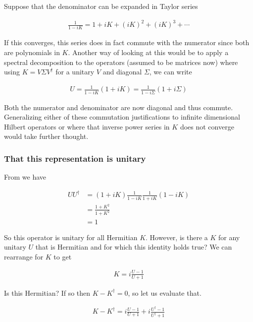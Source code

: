 Suppose that the denominator can be expanded in Taylor series

\begin{align*}
\frac{1}{1-iK} = 1 + iK + (iK)^2 + (iK)^3 + \cdots
\end{align*}

If this converges, this series does in fact commute with the numerator since both are polynomials in $K$.  Another way of looking at this would be to apply a spectral decomposition to the operators (assumed to be matrices now) where using $K = V \Sigma V^\dagger$ for a unitary $V$ and diagonal $\Sigma$, we can write

\begin{align*}
U = \frac{1}{1-iK}(1 + iK) = \frac{1}{1-i \Sigma}(1 + i \Sigma)
\end{align*}

Both the numerator and denominator are now diagonal and thus commute.  Generalizing either of these commutation justifications to infinite dimensional Hilbert operators or where that inverse power series in $K$ does not converge would take further thought.

\subsubsection{That this representation is unitary}

From  we have

\begin{align*}
U U^\dagger 
&= (1 + iK)\frac{1}{1-iK} \frac{1}{1+iK} (1 - iK) \\
&= \frac{1 + K^2}{1+K^2} \\
&= 1
\end{align*}

So this operator is unitary for all Hermitian $K$.  However, is there a $K$ for any unitary $U$ that is Hermitian and for which this identity holds true?  We can rearrange for $K$ to get

\begin{align}\label{eqn:desaiDiracNotes:3}
K = i \frac{ U - 1 }{U + 1}
\end{align}

Is this Hermitian?  If so then $K - K^\dagger = 0$, so let us evaluate that.

\begin{align*}
K - K^\dagger = i \frac{ U - 1 }{U + 1} + i \frac{ U^\dagger - 1 }{U^\dagger + 1}
\end{align*}

